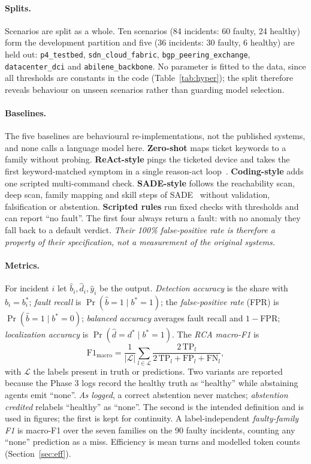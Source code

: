 \documentclass[pdflatex,sn-basic,Numbered,iicol]{sn-jnl}
\begin{document}
\paragraph{Splits.} Scenarios are split as a whole. Ten scenarios (84 incidents: 60 faulty, 24 healthy) form the development partition and five (36 incidents: 30 faulty, 6 healthy) are held out: \texttt{p4\_testbed}, \texttt{sdn\_cloud\_fabric}, \texttt{bgp\_peering\_exchange}, \texttt{datacenter\_dci} and \texttt{abilene\_backbone}. No parameter is fitted to the data, since all thresholds are constants in the code (Table~\ref{tab:hyper}); the split therefore reveals behaviour on unseen scenarios rather than guarding model selection.

\paragraph{Baselines.} The five baselines are behavioural re-implementations, not the published systems, and none calls a language model here. \textbf{Zero-shot} maps ticket keywords to a family without probing. \textbf{ReAct-style} pings the ticketed device and takes the first keyword-matched symptom in a single reason-act loop~\cite{yao2023react}. \textbf{Coding-style} adds one scripted multi-command check. \textbf{SADE-style} follows the reachability scan, deep scan, family mapping and skill steps of SADE~\cite{tseng2026sade} without validation, falsification or abstention. \textbf{Scripted rules} run fixed checks with thresholds and can report ``no fault''. The first four always return a fault: with no anomaly they fall back to a default verdict. \emph{Their 100\% false-positive rate is therefore a property of their specification, not a measurement of the original systems.}

\paragraph{Metrics.} For incident $i$ let $\hat b_i,\hat d_i,\hat y_i$ be the output. \emph{Detection accuracy} is the share with $\hat b_i=b^{*}_i$; \emph{fault recall} is $\Pr(\hat b=1\mid b^{*}=1)$; the \emph{false-positive rate} (FPR) is $\Pr(\hat b=1\mid b^{*}=0)$; \emph{balanced accuracy} averages fault recall and $1-$FPR; \emph{localization accuracy} is $\Pr(\hat d=d^{*}\mid b^{*}=1)$. The \emph{RCA macro-F1} is
\begin{equation}
\mathrm{F1}_{\text{macro}}=\frac{1}{|\mathcal{L}|}\sum_{l\in\mathcal{L}}\frac{2\,\mathrm{TP}_l}{2\,\mathrm{TP}_l+\mathrm{FP}_l+\mathrm{FN}_l},
\label{eq:f1}
\end{equation}
with $\mathcal{L}$ the labels present in truth or predictions. Two variants are reported because the Phase 3 logs record the healthy truth as ``healthy'' while abstaining agents emit ``none''. \emph{As logged}, a correct abstention never matches; \emph{abstention credited} relabels ``healthy'' as ``none''. The second is the intended definition and is used in figures; the first is kept for continuity. A label-independent \emph{faulty-family F1} is macro-F1 over the seven families on the 90 faulty incidents, counting any ``none'' prediction as a miss. Efficiency is mean turns and modelled token counts (Section~\ref{sec:eff}).
\end{document}
